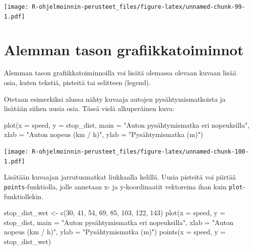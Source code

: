 \documentclass[
]{book}
\newenvironment{Shaded}{\begin{snugshade}}{\end{snugshade}}
\newcommand{\AttributeTok}[1]{\textcolor[rgb]{0.77,0.63,0.00}{#1}}
\newcommand{\DecValTok}[1]{\textcolor[rgb]{0.00,0.00,0.81}{#1}}
\newcommand{\FunctionTok}[1]{\textcolor[rgb]{0.00,0.00,0.00}{#1}}
\newcommand{\NormalTok}[1]{#1}
\newcommand{\OtherTok}[1]{\textcolor[rgb]{0.56,0.35,0.01}{#1}}
\newcommand{\StringTok}[1]{\textcolor[rgb]{0.31,0.60,0.02}{#1}}
\begin{document}
\texttt{[image: R-ohjelmoinnin-perusteet\_files/figure-latex/unnamed-chunk-99-1.pdf]}

\hypertarget{alemman-tason-grafiikkatoiminnot}{%
\section{Alemman tason grafiikkatoiminnot}\label{alemman-tason-grafiikkatoiminnot}}

Alemman tason grafiikkatoiminnoilla voi lisätä olemassa olevaan kuvaan lisää osia, kuten tekstiä, pisteitä tai selitteen (legend).

Otetaan esimerkiksi alussa nähty kuvaaja autojen pysähtymismatkoista ja lisätään siihen uusia osia. Tässä vielä alkuperäinen kuva:

\begin{Shaded}
\begin{Highlighting}[]
\FunctionTok{plot}\NormalTok{(}\AttributeTok{x =}\NormalTok{ speed, }\AttributeTok{y =}\NormalTok{ stop\_dist,}
     \AttributeTok{main =} \StringTok{"Auton pysähtymismatka eri nopeuksilla"}\NormalTok{,}
     \AttributeTok{xlab =} \StringTok{"Auton nopeus (km / h)"}\NormalTok{, }\AttributeTok{ylab =} \StringTok{"Pysähtymismatka (m)"}\NormalTok{)}
\end{Highlighting}
\end{Shaded}

\texttt{[image: R-ohjelmoinnin-perusteet\_files/figure-latex/unnamed-chunk-100-1.pdf]}

Lisätään kuvaajan jarrutusmatkat liukkaalla kelillä. Uusia pisteitä voi piirtää \texttt{points}-funktiolla, jolle annetaan x- ja y-koordinaatit vektoreina ihan kuin \texttt{plot}-funktiollekin.

\begin{Shaded}
\begin{Highlighting}[]
\NormalTok{stop\_dist\_wet }\OtherTok{\textless{}{-}} \FunctionTok{c}\NormalTok{(}\DecValTok{30}\NormalTok{, }\DecValTok{41}\NormalTok{, }\DecValTok{54}\NormalTok{, }\DecValTok{69}\NormalTok{, }\DecValTok{85}\NormalTok{, }\DecValTok{103}\NormalTok{, }\DecValTok{122}\NormalTok{, }\DecValTok{143}\NormalTok{)}
\FunctionTok{plot}\NormalTok{(}\AttributeTok{x =}\NormalTok{ speed, }\AttributeTok{y =}\NormalTok{ stop\_dist,}
     \AttributeTok{main =} \StringTok{"Auton pysähtymismatka eri nopeuksilla"}\NormalTok{,}
     \AttributeTok{xlab =} \StringTok{"Auton nopeus (km / h)"}\NormalTok{, }\AttributeTok{ylab =} \StringTok{"Pysähtymismatka (m)"}\NormalTok{)}
\FunctionTok{points}\NormalTok{(}\AttributeTok{x =}\NormalTok{ speed, }\AttributeTok{y =}\NormalTok{ stop\_dist\_wet)}
\end{Highlighting}
\end{Shaded}
\end{document}
